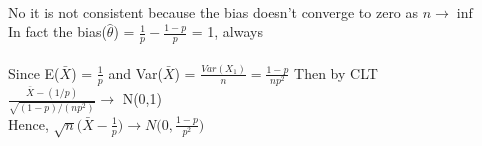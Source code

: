 \\

No it is not consistent because the bias doesn't converge to zero as $n \to \inf$\\

In fact the bias($\hat{\theta}$) = $\frac{1}{p} - \frac{1-p}{p}$ = 1, always\\

\\

Since E($\bar{X}$) = $\frac{1}{p}$ and Var($\bar{X}$) = $\frac{Var(X_1)}{n} = \frac{1-p}{np^2}$ Then by CLT\\

$\frac{\bar{X} - (1/p)}{\sqrt{(1-p)/(np^2)}} \to$ N(0,1)\\

Hence, $\sqrt{n} \Big( \bar{X} - \frac{1}{p} \Big) \to N\Big(0, \frac{1-p}{p^2}\Big)$\\
